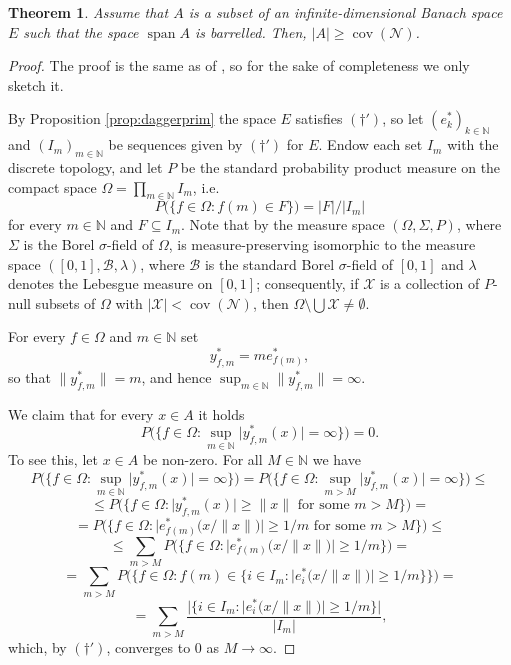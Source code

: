 \documentclass[a4paper,11pt,fleqn]{amsart}
\newtheorem{theorem}{Theorem}[section]
\theoremstyle{definition}
\theoremstyle{remark}
\numberwithin{equation}{section}
\newcommand{\N}{\mathbb{N}}
\newcommand{\bB}{\mathcal{B}}
\newcommand{\nN}{\mathcal{N}}
\newcommand{\xX}{\mathcal{X}}
\DeclareMathOperator{\cov}{cov}
\newcommand{\sm}{\setminus}
\newcommand{\sub}{\subseteq}
\DeclareMathOperator{\spn}{span}
\begin{document}
\begin{theorem}\label{thm:main}
    Assume that $A$ is a subset of an infinite-dimensional Banach space $E$ such that the space $\spn A$ is barrelled. Then, $|A|\ge\cov(\nN)$.
\end{theorem}
\begin{proof}
    The proof is the same as of \cite[Theorem 4.9]{BS24}, so for the sake of completeness we only sketch it.

    By Proposition \ref{prop:daggerprim} the space $E$ satisfies $(\dagger')$, so let $(e_k^*)_{k\in\N}$ and $(I_m)_{m\in\N}$ be sequences given by $(\dagger')$ for $E$. Endow each set $I_m$ with the discrete topology, and let $P$ be the standard probability product measure on the compact space $\Omega=\prod_{m\in\N}I_m$, i.e.
    \[P\big(\{f\in\Omega\colon f(m)\in F\}\big)=|F|/|I_m|\]
    for every $m\in\N$ and $F\sub I_m$. Note that by \cite[Theorem 17.41]{Kec95} the measure space $(\Omega,\Sigma,P)$, where $\Sigma$ is the Borel $\sigma$-field of $\Omega$, is measure-preserving isomorphic to the measure space $([0,1],\bB,\lambda)$, where $\bB$ is the standard Borel $\sigma$-field of $[0,1]$ and $\lambda$ denotes the Lebesgue measure on $[0,1]$; consequently, if $\xX$ is a collection of $P$-null subsets of $\Omega$ with $|\xX|<\cov(\nN)$, then $\Omega\sm\bigcup\xX\neq\emptyset$.
    
    For every $f\in\Omega$ and $m\in\N$ set
    \[y_{f,m}^*=me_{f(m)}^*,\]
    so that $\big\|y_{f,m}^*\big\|=m$, and hence $\sup_{m\in\N}\big\|y_{f,m}^*\big\|=\infty$.

    We claim that for every $x\in A$ it holds
    \[\tag{$*$}P\Big(\Big\{f\in\Omega\colon \sup_{m\in\N}\big|y_{f,m}^*(x)\big|=\infty\Big\}\Big)=0.\]
    To see this, let $x\in A$ be non-zero. For all $M\in\N$ we have
    \[P\Big(\Big\{f\in\Omega\colon \sup_{m\in\N}\big|y_{f,m}^*(x)\big|=\infty\Big\}\Big)=P\Big(\Big\{f\in\Omega\colon \sup_{m>M}\big|y_{f,m}^*(x)\big|=\infty\Big\}\Big)\le\]
    \[\le P\Big(\Big\{f\in\Omega\colon \big|y_{f,m}^*(x)\big|\ge\|x\|\text{ for some }m>M\Big\}\Big)=\]
    \[=P\Big(\Big\{f\in\Omega\colon \big|e_{f(m)}^*\big(x/\|x\|\big)\big|\ge1/m\text{ for some }m>M\Big\}\Big)\le\]
    \[\le\sum_{m>M}P\Big(\Big\{f\in\Omega\colon \big|e_{f(m)}^*\big(x/\|x\|\big)\big|\ge1/m\Big\}\Big)=\]
    \[=\sum_{m>M}P\Big(\Big\{f\in\Omega\colon f(m)\in\big\{i\in I_m\colon \big|e_{i}^*\big(x/\|x\|\big)\big|\ge1/m\big\}\Big\}\Big)=\]
    \[=\sum_{m>M}\frac{\big|\big\{i\in I_m\colon \big|e_{i}^*\big(x/\|x\|\big)\big|\ge1/m\big\}\big|}{|I_m|},\]
    which, by $(\dagger')$, %
    converges to $0$ as $M\to\infty$.


\end{proof}
\end{document}

